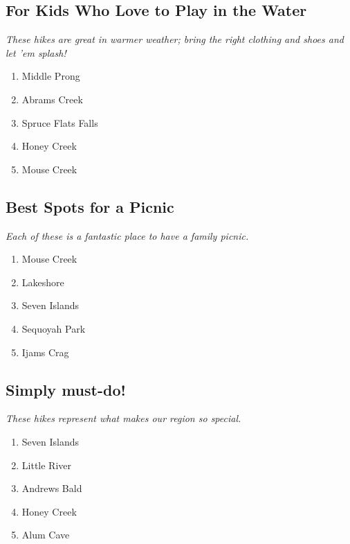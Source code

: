 \documentclass[
  letterpaper,
  DIV=11,
  numbers=noendperiod]{scrreprt}
\providecommand{\tightlist}{%
  \setlength{\itemsep}{0pt}\setlength{\parskip}{0pt}}\usepackage{longtable,booktabs,array}
\begin{document}
\subsection{For Kids Who Love to Play in the
Water}\label{for-kids-who-love-to-play-in-the-water}

\emph{These hikes are great in warmer weather; bring the right clothing
and shoes and let 'em splash!}

\begin{enumerate}
\def\labelenumi{\arabic{enumi}.}
\tightlist
\item
  Middle Prong
\item
  Abrams Creek
\item
  Spruce Flats Falls
\item
  Honey Creek
\item
  Mouse Creek
\end{enumerate}

\subsection{Best Spots for a Picnic}\label{best-spots-for-a-picnic}

\emph{Each of these is a fantastic place to have a family picnic.}

\begin{enumerate}
\def\labelenumi{\arabic{enumi}.}
\tightlist
\item
  Mouse Creek
\item
  Lakeshore
\item
  Seven Islands
\item
  Sequoyah Park
\item
  Ijams Crag
\end{enumerate}

\subsection{Simply must-do!}\label{simply-must-do}

\emph{These hikes represent what makes our region so special.}

\begin{enumerate}
\def\labelenumi{\arabic{enumi}.}
\tightlist
\item
  Seven Islands
\item
  Little River
\item
  Andrews Bald
\item
  Honey Creek
\item
  Alum Cave
\end{enumerate}
\end{document}
